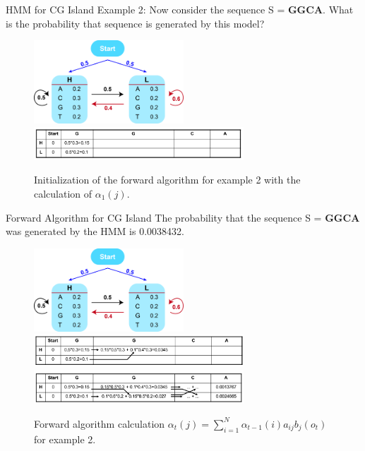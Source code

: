 \documentclass{beamer}
\begin{document}
\begin{frame}{HMM for CG Island}
	Example 2: Now consider the sequence  S = \textbf{GGCA}. What is the probability that sequence is generated by this model?
	\begin{figure}
		\centering
		\includegraphics[width = 0.5\textwidth]{example1.jpg}
		\includegraphics[width = 0.7\textwidth]{example2cal1.png}
		\caption{Initialization of the forward algorithm for example 2 with the calculation of $\alpha_1(j)$.}
	\end{figure}
	
\end{frame}

\begin{frame}{Forward Algorithm for CG Island}
	The probability that the sequence S = \textbf{GGCA} was generated by the HMM is 0.0038432.
	\begin{figure}
		\centering
		\includegraphics[width = 0.5\textwidth]{example1.jpg}
		\includegraphics[width = 0.7\textwidth]{example2cal2.png}
		\includegraphics[width = 0.7\textwidth]{example2cal3.png}
		\caption{Forward algorithm calculation $\alpha_t(j) = \sum_{i=1}^N \alpha_{t-1}(i)a_{ij} b_j(o_t)$ for example 2.}
	\end{figure}
\end{frame}
\end{document}
